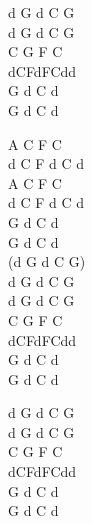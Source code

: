 \begin{chord}
    d G d C G\\
    d G d C G\\
    C G F C\\
    dCFdFCdd\\
    G d C d\\
    G d C d

    A C F C\\
    d C F d C d\\
    A C F C\\
    d C F d C d\\
    G d C d\\
    G d C d\\
    (d G d C G)\\
    d G d C G\\
    d G d C G\\
    C G F C\\
    dCFdFCdd\\
    G d C d\\
    G d C d

    d G d C G\\
    d G d C G\\
    C G F C\\
    dCFdFCdd\\
    G d C d\\
    G d C d
\end{chord}